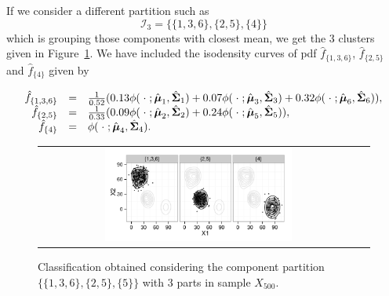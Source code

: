 \documentclass[10pt, a4paper]{article}
\newcommand{\m}[1]{\boldsymbol{#1}}
\begin{document}
\begin{spacing}{1.9}
If we consider a different partition such as
\[\mathcal{I}_3 = \{\{1, 3, 6\},\{2, 5\},\{4\}\}\]
which is grouping those components with closest mean, we get the 3 clusters given in Figure~\ref{ex_part3a}. We have included the isodensity curves of pdf $\hat{f}_{\{1,3,6\}}$, $\hat{f}_{\{2, 5\}}$ and $\hat{f}_{\{4\}}$ given by

\[
\begin{array}{r c l}
\hat{f}_{\{1,3,6\}} & = & \frac{1}{0.52}(0.13 \phi(\;\cdot\; ; \hat{\m\mu}_1, \hat{\m\Sigma}_1) + 0.07 \phi(\;\cdot\; ; \hat{\m\mu}_3, \hat{\m\Sigma}_3) + 0.32 \phi(\;\cdot\; ; \hat{\m\mu}_6, \hat{\m\Sigma}_6)), \\
\hat{f}_{\{2, 5\}} & = &  \frac{1}{0.33}(0.09 \phi(\;\cdot\; ; \hat{\m\mu}_2, \hat{\m\Sigma}_2) + 0.24 \phi(\;\cdot\; ; \hat{\m\mu}_5, \hat{\m\Sigma}_5)), \\
\hat{f}_{\{4\}} & = &\phi(\;\cdot\; ; \hat{\m\mu}_4, \hat{\m\Sigma}_4).
\end{array}
\]



\begin{figure}[!h]
\begin{center}
\begin{tabular}{cc}
  \includegraphics[trim=0cm 0cm 0cm 0cm,width=0.6\textwidth]{partition-example-part3a.pdf} \\
 \end{tabular}
 \caption{Classification obtained considering the component partition $\{\{1, 3, 6 \}, \{2, 5\}, \{5\}\}$ with 3 parts in sample $X_{500}$.}\label{ex_part3a}
\end{center}
\end{figure}


\end{spacing}
\end{document}
